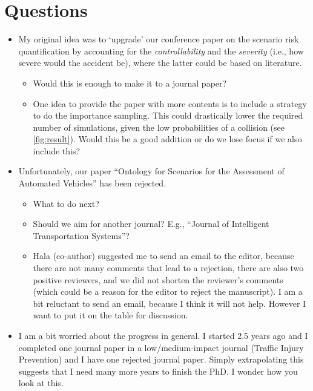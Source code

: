 \documentclass[10pt,final,a4paper,oneside,onecolumn]{article}
\begin{document}
\section{Questions}

\begin{itemize}
	\item My original idea was to `upgrade' our conference paper on the scenario risk quantification by accounting for the \emph{controllability} and the \emph{severity} (i.e., how severe would the accident be), where the latter could be based on literature. 
	\begin{itemize}
		\item Would this is enough to make it to a journal paper?
		\item One idea to provide the paper with more contents is to include a strategy to do the importance sampling. This could drastically lower the required number of simulations, given the low probabilities of a collision (see \cref{fig:result}). Would this be a good addition or do we lose focus if we also include this?
	\end{itemize}
	\item Unfortunately, our paper ``Ontology for Scenarios for the Assessment of Automated Vehicles'' has been rejected. 
	\begin{itemize}
		\item What to do next?
		\item Should we aim for another journal? E.g., ``Journal of Intelligent Transportation Systems''?
		\item Hala (co-author) suggested me to send an email to the editor, because there are not many comments that lead to a rejection, there are also two positive reviewers, and we did not shorten the reviewer's comments (which could be a reason for the editor to reject the manuscript). I am a bit reluctant to send an email, because I think it will not help. However I want to put it on the table for discussion.
	\end{itemize}
	
	\item I am a bit worried about the progress in general. I started 2.5 years ago and I completed one journal paper in a low/medium-impact journal (Traffic Injury Prevention) and I have one rejected journal paper. Simply extrapolating this suggests that I need many more years to finish the PhD. I wonder how you look at this.
\end{itemize}
\end{document}
